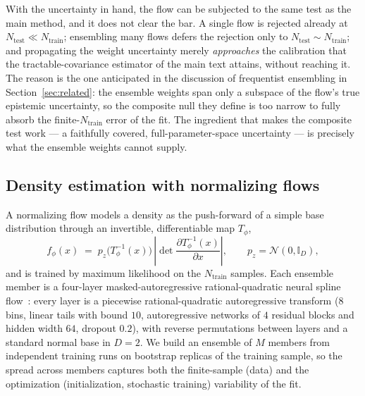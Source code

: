 With the uncertainty in hand, the flow can be subjected to the same test as the
main method, and it does not clear the bar. A single flow is rejected already at
$N_{\mathrm{test}}\!\ll\!N_{\mathrm{train}}$; ensembling many flows defers the
rejection only to $N_{\mathrm{test}}\!\sim\!N_{\mathrm{train}}$; and propagating
the weight uncertainty merely \emph{approaches} the calibration that the
tractable-covariance estimator of the main text attains, without reaching it. The
reason is the one anticipated in the discussion of frequentist ensembling in
Section~\ref{sec:related}: the ensemble weights span only a subspace of the flow's
true epistemic uncertainty, so the composite null they define is too narrow to
fully absorb the finite-$N_{\mathrm{train}}$ error of the fit. The ingredient that
makes the composite test work --- a faithfully covered, full-parameter-space
uncertainty --- is precisely what the ensemble weights cannot supply.

\subsection{Density estimation with normalizing flows}
\label{app:nf-density}
A normalizing flow models a density as the push-forward of a simple base
distribution through an invertible, differentiable map $T_\phi$,
\begin{equation}
  f_\phi(x) \;=\; p_z\!\big(T_\phi^{-1}(x)\big)\,
  \left|\det \frac{\partial T_\phi^{-1}(x)}{\partial x}\right| ,
  \qquad p_z = \mathcal{N}(0,\mathbb{I}_D),
\end{equation}
and is trained by maximum likelihood on the $N_{\mathrm{train}}$ samples. Each
ensemble member is a four-layer masked-autoregressive rational-quadratic neural
spline flow~\citep{NormalizingFlows}: every layer is a piecewise
rational-quadratic autoregressive transform ($8$ bins, linear tails with bound
$10$, autoregressive networks of $4$ residual blocks and hidden width $64$,
dropout $0.2$), with reverse permutations between layers and a standard normal
base in $D=2$. We build an ensemble of $M$ members from independent training runs
on bootstrap replicas of the training sample, so the spread across members
captures both the finite-sample (data) and the optimization (initialization,
stochastic training) variability of the fit.

